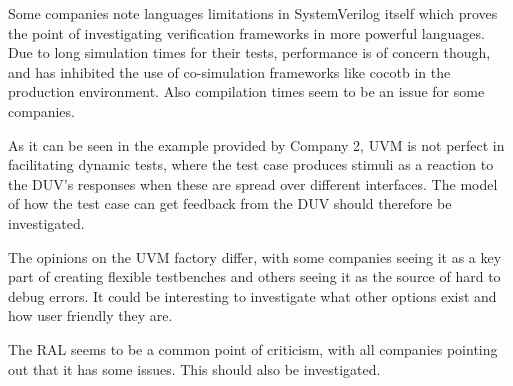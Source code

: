Some companies note languages limitations in SystemVerilog itself which proves the point of investigating
verification frameworks in more powerful languages. Due to long simulation times for their tests, performance is of
concern though, and has inhibited the use of co-simulation frameworks like cocotb in the production environment. Also
compilation times seem to be an issue for some companies.

As it can be seen in the example provided by Company 2, UVM is not perfect in facilitating dynamic tests, where the
test case produces stimuli as a reaction to the DUV's responses when these are spread over different interfaces. The
model of how the test case can get feedback from the DUV should therefore be investigated.

The opinions on the UVM factory differ, with some companies seeing it as a key part of creating flexible testbenches
and others seeing it as the source of hard to debug errors. It could be interesting to investigate what other options
exist and how user friendly they are.

The RAL seems to be a common point of criticism, with all companies pointing out that it has some issues. This should
also be investigated.

